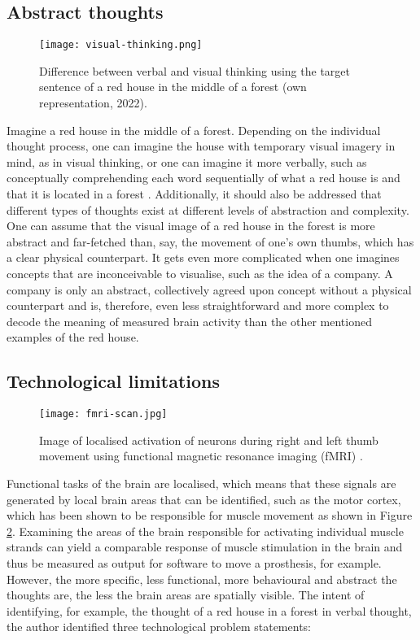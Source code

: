 \subsection{Abstract thoughts}
\label{chapter2-abstract-thoughts}

\begin{figure}[ht]
  \centering
  \texttt{[image: visual-thinking.png]}
  \caption{Difference between verbal and visual thinking using the target sentence of a red house in the middle of a forest (own representation, 2022).}
  \label{fig:visual-thinking}
\end{figure}

Imagine a red house in the middle of a forest. Depending on the individual thought process, one can imagine the house with temporary visual imagery in mind, as in visual thinking, or one can imagine it more verbally, such as conceptually comprehending each word sequentially of what a red house is and that it is located in a forest \citep{amit_asymmetrical_2017}. Additionally, it should also be addressed that different types of thoughts exist at different levels of abstraction and complexity. One can assume that the visual image of a red house in the forest is more abstract and far-fetched than, say, the movement of one's own thumbs, which has a clear physical counterpart. It gets even more complicated when one imagines concepts that are inconceivable to visualise, such as the idea of a company. A company is only an abstract, collectively agreed upon concept without a physical counterpart and is, therefore, even less straightforward and more complex to decode the meaning of measured brain activity than the other mentioned examples of the red house.

\subsection{Technological limitations}
\label{chapter2-technological-limitations}

\begin{figure}[ht]
  \centering
  \texttt{[image: fmri-scan.jpg]}
  \caption{Image of localised activation of neurons during right and left thumb movement using functional magnetic resonance imaging (fMRI) \citep{rashid_bilateral_2018}.}
  \label{fig:fmri-scan}
\end{figure}

Functional tasks of the brain are localised, which means that these signals are generated by local brain areas that can be identified, such as the motor cortex, which has been shown to be responsible for muscle movement as shown in Figure \ref{fig:fmri-scan}. Examining the areas of the brain responsible for activating individual muscle strands can yield a comparable response of muscle stimulation in the brain and thus be measured as output for software to move a prosthesis, for example. However, the more specific, less functional, more behavioural and abstract the thoughts are, the less the brain areas are spatially visible. The intent of identifying, for example, the thought of a red house in a forest in verbal thought, the author identified three technological problem statements:

